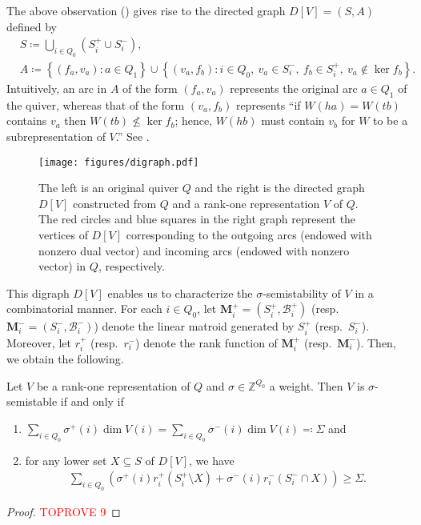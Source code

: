 \documentclass[a4paper,11pt]{article}
\numberwithin{equation}{section}
\newcommand{\Z}{\mathbb{Z}}
\newcommand{\M}{\mathbf{M}}
\begin{document}
The above observation () gives rise to the directed graph $D[V] = (S, A)$ defined by
\begin{align}
    &S \coloneqq \bigcup_{i \in Q_0} \left(S_i^+ \cup S_i^-\right),\\
    &A \coloneqq \left\{ (f_a, v_a) : a \in Q_1 \right\} \cup \left\{ (v_a, f_b) : i \in Q_0,\ v_a \in S_i^-, \ f_b \in S_i^+,\ v_a \notin \ker f_b \right\}.
\end{align}
Intuitively, an arc in $A$ of the form $(f_a, v_a)$ represents the original arc $a \in Q_1$ of the quiver, whereas that of the form $(v_a, f_b)$ represents ``if $W(ha) = W(tb)$ contains $v_a$ then $W(tb) \not\leq \ker f_b$; hence, $W(hb)$ must contain $v_b$ for $W$ to be a subrepresentation of $V$.''
See .
\begin{figure}
    \centering
    \texttt{[image: figures/digraph.pdf]}
    \caption{The left is an original quiver $Q$ and the right is the directed graph $D[V]$ constructed from $Q$ and a rank-one representation $V$ of $Q$. The red circles and blue squares in the right graph represent the vertices of $D[V]$ corresponding to the outgoing arcs (endowed with nonzero dual vector) and incoming arcs (endowed with nonzero vector) in $Q$, respectively.\label{fig:D[V]}}
\end{figure}


This digraph $D[V]$ enables us to characterize the $\sigma$-semistability of $V$ in a combinatorial manner.
For each $i \in Q_0$,
let $\M_i^+ = (S_i^+, \mathcal{B}_i^+)$ (resp.\ $\M_i^- = (S_i^-, \mathcal{B}_i^-)$) denote the linear matroid generated by $S_i^+$ (resp.\ $S_i^-$).
Moreover, let $r_i^+$ (resp.\ $r_i^-$) denote the rank function of $\M_i^+$ (resp.\ $\M_i^-$).
Then, we obtain the following.
\begin{theorem}\label{thm:King:rank-one}
Let $V$ be a rank-one representation of $Q$ and $\sigma \in \Z^{Q_0}$ a weight.
Then $V$ is $\sigma$-semistable if and only if
\begin{enumerate}[{label={\upshape{(K\arabic*)}}}]
    \item $\sum_{i \in Q_0} \sigma^+(i) \dim V(i) = \sum_{i \in Q_0} \sigma^-(i) \dim V(i) \eqqcolon \Sigma$ and
    \item for any lower set $X \subseteq S$ of $D[V]$, we have
    \begin{align}
    \sum_{i \in Q_0}\left( \sigma^+(i) r_i^+(S_i^+ \setminus X) + \sigma^-(i) r_i^-(S_i^- \cap X) \right) \geq \Sigma.
\end{align}
\end{enumerate}
\end{theorem}
\begin{proof}\textcolor{red}{TOPROVE 9}\end{proof}
\end{document}
